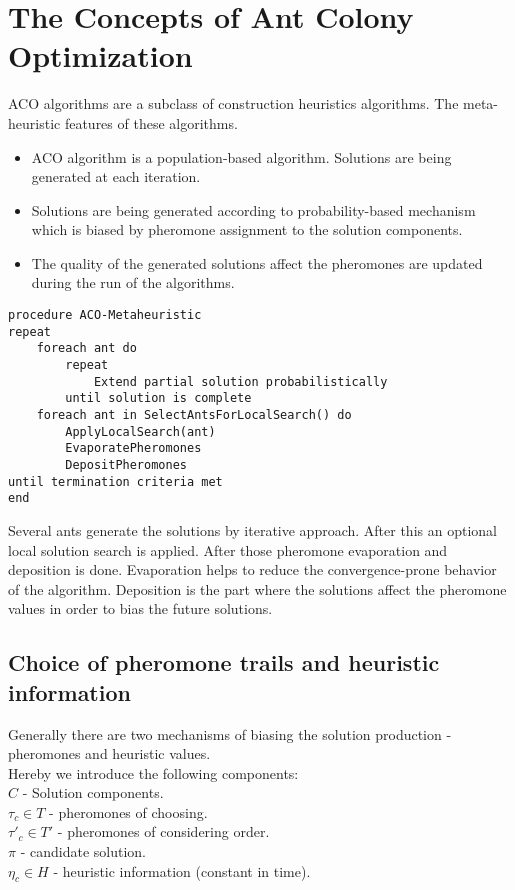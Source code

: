 \section{The Concepts of Ant Colony Optimization}

ACO algorithms are a subclass of construction heuristics algorithms. The meta-heuristic features of these algorithms.

\begin{itemize}
\item ACO algorithm is a population-based algorithm. Solutions are being generated at each iteration.
\item Solutions are being generated according to probability-based mechanism which is biased by pheromone assignment to the solution components.
\item The quality of the generated solutions affect the pheromones are updated during the run of the algorithms.
\end{itemize}


\begin{minipage}[c, breaklines=true]{0.95\textwidth}
\begin{lstlisting}[caption=General ACO pseudo-code]
procedure ACO-Metaheuristic
repeat
	foreach ant do
		repeat
			Extend partial solution probabilistically
		until solution is complete
	foreach ant in SelectAntsForLocalSearch() do
		ApplyLocalSearch(ant)
		EvaporatePheromones
		DepositPheromones
until termination criteria met
end
\end{lstlisting}
\end{minipage}

Several ants generate the solutions by iterative approach. After this an optional local solution search is applied. After those pheromone evaporation and deposition is done. Evaporation helps to reduce the convergence-prone behavior of the algorithm. Deposition is the part where the solutions affect the pheromone values in order to bias the future solutions.

\subsection{Choice of pheromone trails and heuristic information}

Generally there are two mechanisms of biasing the solution production - pheromones and heuristic values. \\
Hereby we introduce the following components: \\
$C$ - Solution components. \\
$\tau_c \in T$ - pheromones of choosing. \\
$\tau'_c \in T'$ - pheromones of considering order. \\
$\pi$ - candidate solution. \\
$\eta_c \in H$ - heuristic information (constant in time). \\

